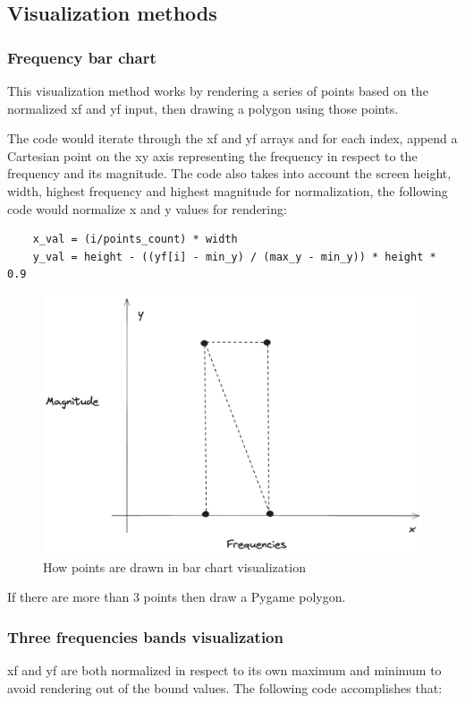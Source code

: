 \documentclass{article}
\begin{document}
\subsection{Visualization methods}
\subsubsection{Frequency bar chart}
This visualization method works by rendering a series of points based on the normalized xf and yf input, then drawing a polygon using those points.

The code would iterate through the xf and yf arrays and for each index, append a Cartesian point on the xy axis  representing the frequency in respect to the frequency and its magnitude. The code also takes into account the screen height, width, highest frequency and highest magnitude for normalization, the following code would normalize x and y values for rendering:

\begin{lstlisting}
    x_val = (i/points_count) * width
    y_val = height - ((yf[i] - min_y) / (max_y - min_y)) * height * 0.9
\end{lstlisting}

\begin{figure}
    \centering
    \includegraphics[width=0.5\linewidth]{barchart.png}
    \caption{How points are drawn in bar chart visualization}
    \label{fig:bar}
\end{figure}

If there are more than 3 points then draw a Pygame polygon.

\newpage

\subsubsection{Three frequencies bands visualization}

xf and yf are both normalized in respect to its own maximum and minimum to avoid rendering out of the bound values. The following code accomplishes that:
\end{document}
